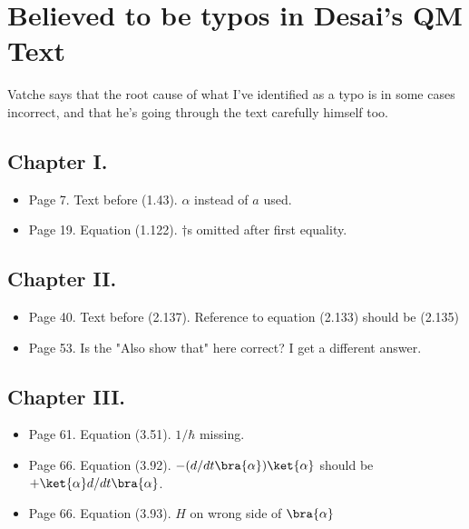 

{}
\date{Oct 31, 2010}

\chapter{Believed to be typos in Desai's QM Text}

\beginArtNoToc

Vatche says that the root cause of what I've identified as a typo is in some cases incorrect, and that he's going through the text carefully himself too.

\section{Chapter I.}

\begin{itemize}
\item Page 7.  Text before (1.43).  $\alpha$ instead of $a$ used.
\item Page 19.  Equation (1.122).  $\dagger$s omitted after first equality.
\end{itemize}

\section{Chapter II.}
\begin{itemize}
\item Page 40.  Text before (2.137).  Reference to equation (2.133) should be (2.135)
\item Page 53.  Is the "Also show that" here correct?  I get a different answer.
\end{itemize}

\section{Chapter III.}
\begin{itemize}
\item Page 61.  Equation (3.51).  $1/\hbar$ missing.
\item Page 66.  Equation (3.92).  $-(d/dt \bra{\alpha}) \ket{\alpha}$ should be $+\ket{\alpha} d/dt \bra{\alpha}$.
\item Page 66.  Equation (3.93).  $H$ on wrong side of $\bra{\alpha}$ 
\end{itemize}

